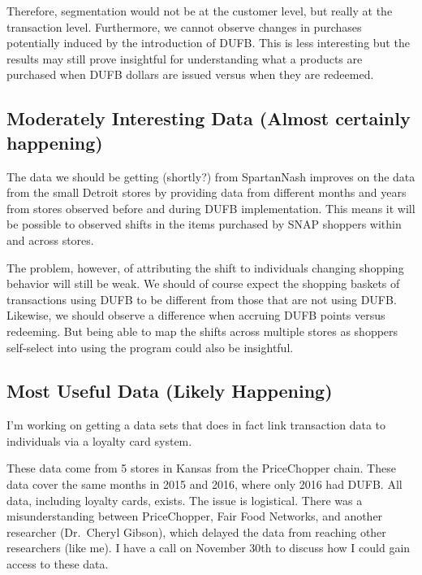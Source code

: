 \documentclass[12pt,letterpaperpaper,]{book}
\begin{document}
Therefore, segmentation would not be at the customer level, but really
at the transaction level. Furthermore, we cannot observe changes in
purchases potentially induced by the introduction of DUFB. This is less
interesting but the results may still prove insightful for understanding
what a products are purchased when DUFB dollars are issued versus when
they are redeemed.

\subsection*{Moderately Interesting Data (Almost certainly
happening)}\label{moderately-interesting-data-almost-certainly-happening}

The data we should be getting (shortly?) from SpartanNash improves on
the data from the small Detroit stores by providing data from different
months and years from stores observed before and during DUFB
implementation. This means it will be possible to observed shifts in the
items purchased by SNAP shoppers within and across stores.

The problem, however, of attributing the shift to individuals changing
shopping behavior will still be weak. We should of course expect the
shopping baskets of transactions using DUFB to be different from those
that are not using DUFB. Likewise, we should observe a difference when
accruing DUFB points versus redeeming. But being able to map the shifts
across multiple stores as shoppers self-select into using the program
could also be insightful.

\subsection*{Most Useful Data (Likely
Happening)}\label{most-useful-data-likely-happening}

I'm working on getting a data sets that does in fact link transaction
data to individuals via a loyalty card system.

These data come from 5 stores in Kansas from the PriceChopper chain.
These data cover the same months in 2015 and 2016, where only 2016 had
DUFB. All data, including loyalty cards, exists. The issue is
logistical. There was a misunderstanding between PriceChopper, Fair Food
Networks, and another researcher (Dr.~Cheryl Gibson), which delayed the
data from reaching other researchers (like me). I have a call on
November 30th to discuss how I could gain access to these data.
\end{document}
